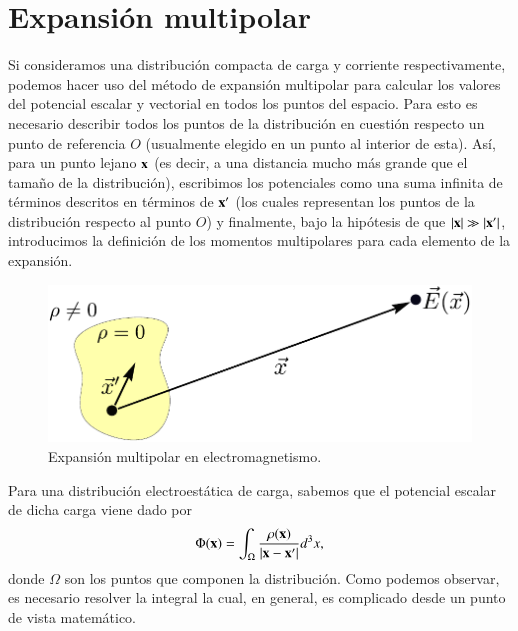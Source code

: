 \section{Expansión multipolar}
\label{sec:2}

Si consideramos una distribución compacta de carga y corriente respectivamente, podemos hacer uso del método de expansión multipolar para calcular los valores del potencial escalar y vectorial en todos los puntos del espacio. Para esto es necesario describir todos los puntos de la distribución en cuestión respecto un punto de referencia $O$ (usualmente elegido en un punto al interior de esta). Así, para un punto lejano $\vb{x}$ (es decir, a una distancia mucho más grande que el tamaño de la distribución), escribimos los potenciales como una suma infinita de términos descritos en términos de $\vb{x}'$ (los cuales representan los puntos de la distribución respecto al punto $O$) y finalmente, bajo la hipótesis de que $|\vb{x}| \gg |\vb{x}'|$, introducimos la definición de los momentos multipolares para cada elemento de la expansión.
\begin{figure}[h!]
\centering
\includegraphics[scale=1]{images/multipolar.pdf}
\caption[Expansión multipolar electromagnética]{Expansión multipolar en electromagnetismo.}
\end{figure}

Para una distribución electroestática de carga, sabemos que el potencial escalar de dicha carga viene dado por
\begin{equation}
\Phi(\vb{x}) = \int_{\Omega} \frac{\rho(\vb{x})}{|\vb{x} - \vb{x}'|} d^3x,
\end{equation}
donde $\Omega$ son los puntos que componen la distribución. Como podemos observar, es necesario resolver la integral la cual, en general, es complicado desde un punto de vista matemático. 

